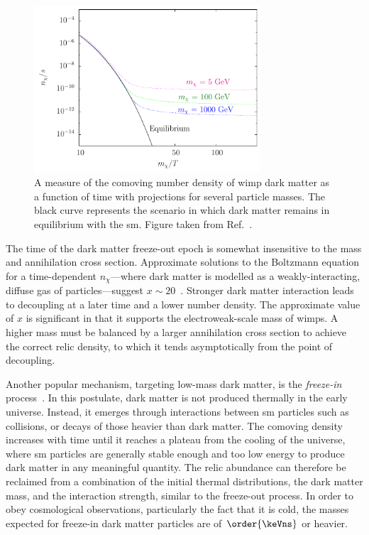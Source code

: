 \begin{figure}[htbp]
    \centering
    \includegraphics[width=0.75\textwidth]{figures/dm_abundance.pdf}
    \caption[A measure of the comoving number density of WIMP dark matter as a function of time with projections for several particle masses]{A measure of the comoving number density of \acrshort{wimp} dark matter as a function of time with projections for several particle masses. The black curve represents the scenario in which dark matter remains in equilibrium with the \acrlong{sm}. Figure taken from Ref.~.}
    \label{fig:theory_dm_abundance}
\end{figure}

The time of the dark matter freeze-out epoch is somewhat insensitive to the mass and annihilation cross section. Approximate solutions to the Boltzmann equation for a time-dependent $n_{\chi}$---where dark matter is modelled as a weakly-interacting, diffuse gas of particles---suggest $x \sim \text{20}$~\cite{Lisanti:2016jxe,Bender:2012gc}. Stronger dark matter interaction leads to decoupling at a later time and a lower number density. The approximate value of $x$ is significant in that it supports the electroweak-scale mass of \acrshort{wimp}s. A higher mass must be balanced by a larger annihilation cross section to achieve the correct relic density, to which it tends asymptotically from the point of decoupling.

Another popular mechanism, targeting low-mass dark matter, is the \emph{freeze-in} process~\cite{Hall:2009bx,Krnjaic:2017tio}. In this postulate, dark matter is not produced thermally in the early universe. Instead, it emerges through interactions between \acrshort{sm} particles such as collisions, or decays of those heavier than dark matter. The comoving density increases with time until it reaches a plateau from the cooling of the universe, where \acrshort{sm} particles are generally stable enough and too low energy to produce dark matter in any meaningful quantity. The relic abundance can therefore be reclaimed from a combination of the initial thermal distributions, the dark matter mass, and the interaction strength, similar to the freeze-out process. In order to obey cosmological observations, particularly the fact that it is cold, the masses expected for freeze-in dark matter particles are of $\order{\keVns}$ or heavier.


